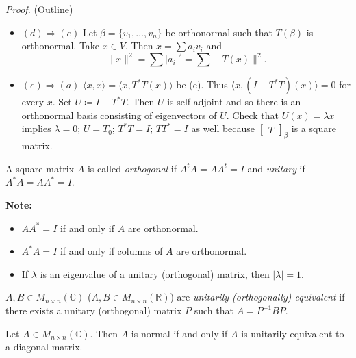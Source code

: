 \documentclass[12pt]{article}
\newenvironment{theorem}[2][Theorem]{\begin{trivlist}
\item[\hskip \labelsep {\bfseries #1}\hskip \labelsep {\bfseries #2.}]}{\end{trivlist}}
\newenvironment{definition}[2][Definition]{\begin{trivlist}
\item[\hskip \labelsep {\bfseries #1}\hskip \labelsep {\bfseries #2}]}{\end{trivlist}}
\begin{document}
\textit{Proof.} (Outline) 

\begin{itemize}
    \item $(d) \Longrightarrow (e)$ Let $\beta = \{v_1, \dots, v_n\}$ be orthonormal such that $T(\beta)$ is orthonormal. Take $x \in V$. Then $x = \sum a_iv_i$ and $$\lVert x \rVert^2 = \sum \lvert a_i \rvert^2 = \sum \lVert T(x) \rVert^2.$$  
    
    \item $(e) \Longrightarrow (a)$ $\langle x, x \rangle = \langle x, T^*T(x) \rangle$ be (e). Thus $\langle x, (I - T^*T)(x) \rangle = 0$ for every $x$. Set $U \coloneqq I - T^*T$. Then $U$ is self-adjoint and so there is an orthonormal basis consisting of eigenvectors of $U$. Check that $U(x) = \lambda x$ implies $\lambda = 0$; $U = T_0$; $T^*T = I$; $TT^* = I$ as well because $\begin{bmatrix} T \end{bmatrix}_\beta$ is a square matrix.
\end{itemize}

\begin{definition}{10}
A square matrix $A$ is called \textit{orthogonal} if $A^tA = AA^t = I$ and \textit{unitary} if $A^*A = AA^* = I$.
\end{definition}

\noindent\textbf{Note:} \text{ }

\begin{itemize}
    \item $AA^* = I$ if and only if $A$ are orthonormal.
    
    \item $A^*A = I$ if and only if columns of $A$ are orthonormal. 
    
    \item If $\lambda$ is an eigenvalue of a unitary (orthogonal) matrix, then $\lvert \lambda \rvert = 1$.
\end{itemize}

\begin{definition}{11}
$A, B \in M_{n \times n}(\mathbb{C})$ ($A, B \in M_{n \times n}(\mathbb{R})$) are \textit{unitarily (orthogonally) equivalent} if there exists a unitary (orthogonal) matrix $P$ such that $A = P^{-1}BP$.
\end{definition}

\begin{theorem}{6.19}
Let $A \in M_{n \times n}(\mathbb{C})$. Then $A$ is normal if and only if $A$ is unitarily equivalent to a diagonal matrix. 
\end{theorem}
\end{document}
